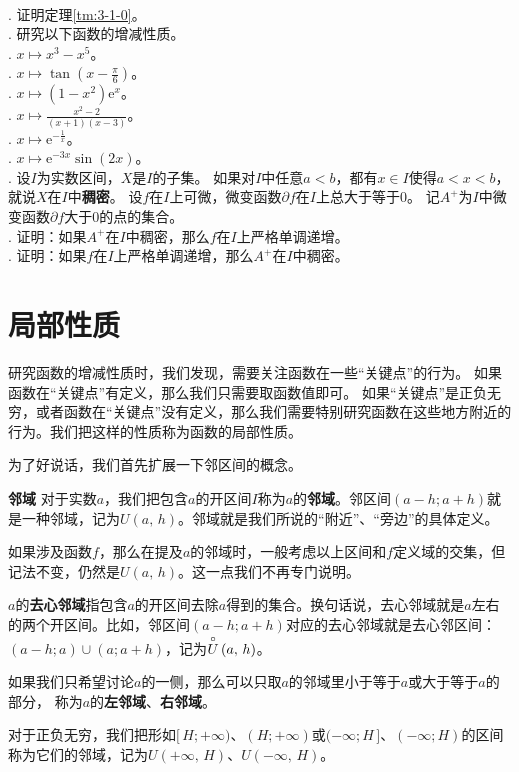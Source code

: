 \documentclass[12pt,UTF8]{ctexbook}
\begin{document}
\begin{xt}
    \mbox{} \\
    . 证明定理\ref{tm:3-1-0}。\\
    . 研究以下函数的增减性质。\\
    . $x\mapsto x^3 - x^5$。\\
    . $x\mapsto \tan{\left(x - \frac{\pi}{6}\right)}$。\\
    . $x\mapsto (1 - x^2) \mathrm{e}^x$。\\
    . $x\mapsto \frac{x^2 - 2}{(x + 1)(x - 3)}$。\\
    . $x\mapsto \mathrm{e}^{-\frac{1}{x}}$。\\
    . $x\mapsto \mathrm{e}^{-3x} \sin{(2x)}$。\\
    . 设$I$为实数区间，$X$是$I$的子集。
    如果对$I$中任意$a < b$，都有$x\in I$使得$a<x<b$，就说$X$在$I$中\textbf{稠密}。
    设$f$在$I$上可微，微变函数$\partial f$在$I$上总大于等于$0$。
    记$A^+$为$I$中微变函数$\partial f$大于$0$的点的集合。\\
    . 证明：如果$A^+$在$I$中稠密，那么$f$在$I$上严格单调递增。\\
    . 证明：如果$f$在$I$上严格单调递增，那么$A^+$在$I$中稠密。
    
\end{xt}


 \section{局部性质}

研究函数的增减性质时，我们发现，需要关注函数在一些“关键点”的行为。
如果函数在“关键点”有定义，那么我们只需要取函数值即可。
如果“关键点”是正负无穷，或者函数在“关键点”没有定义，那么我们需要特别研究函数在这些地方附近的行为。我们把这样的性质称为函数的局部性质。

为了好说话，我们首先扩展一下邻区间的概念。
\begin{df}{\textbf{邻域}}
    对于实数$a$，我们把包含$a$的开区间$I$称为$a$的\textbf{邻域}。邻区间$(a-h; a+h)$就是一种邻域，记为$U(a,\,h)$。邻域就是我们所说的“附近”、“旁边”的具体定义。

    如果涉及函数$f$，那么在提及$a$的邻域时，一般考虑以上区间和$f$定义域的交集，但记法不变，仍然是$U(a,\,h)$。这一点我们不再专门说明。

    $a$的\textbf{去心邻域}指包含$a$的开区间去除$a$得到的集合。换句话说，去心邻域就是$a$左右的两个开区间。比如，邻区间$(a-h; a+h)$对应的去心邻域就是去心邻区间：$(a-h; a)\cup(a; a+h)$，记为$\overset{\circ}{U}\left(a,\,h\right)$。
    
    如果我们只希望讨论$a$的一侧，那么可以只取$a$的邻域里小于等于$a$或大于等于$a$的部分，
    称为$a$的\textbf{左邻域}、\textbf{右邻域}。

    对于正负无穷，我们把形如$[\,H; +\infty)$、$(H; +\infty)$或$(-\infty; H\,]$、$(-\infty; H)$的区间称为它们的邻域，记为$U(+\infty,\,H)$、$U(-\infty,\,H)$。
\end{df}
\end{document}
